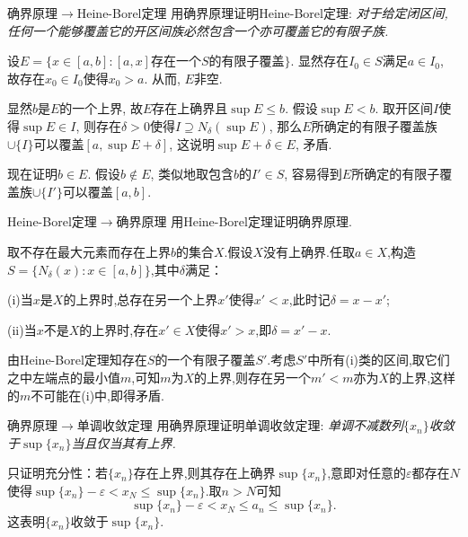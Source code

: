 \begin{exercise}{确界原理$\to$Heine-Borel定理}
	用确界原理证明Heine-Borel定理: \textit{ 对于给定闭区间,任何一个能够覆盖它的开区间族必然包含一个亦可覆盖它的有限子族. }
\end{exercise}
\begin{solution}
	设$E=\{ x \in [a,b]:[a,x]\text{存在一个$S$的有限子覆盖} \}$. 显然存在$I_0 \in S$满足$a \in I_0$, 故存在$x_0 \in I_0$使得$x_0>a$. 从而, $E$非空. 
	
	显然$b$是$E$的一个上界, 故$E$存在上确界且$\sup E \leq b$. 假设$\sup E < b$. 取开区间$I$使得$\sup E \in I$, 则存在$\delta >0$使得$I \supseteq N_{\delta}(\sup E)$, 那么$E$所确定的有限子覆盖族$\cup \{ I \}$可以覆盖$[a,\sup E+\delta]$, 这说明$\sup E+\delta \in E$, 矛盾. 
	
	现在证明$b \in E$. 假设$b \notin E$, 类似地取包含$b$的$I' \in S$, 容易得到$E$所确定的有限子覆盖族$\cup \{ I' \}$可以覆盖$[a,b]$. 
\end{solution}

\begin{exercise}{Heine-Borel定理$\to$确界原理}
	用Heine-Borel定理证明确界原理. 
\end{exercise}
\begin{solution}
	取不存在最大元素而存在上界$b$的集合$X$.假设$X$没有上确界.任取$a \in X$,构造$S=\{ N_{\delta}(x):x \in [a,b] \}$,其中$\delta$满足：
	
	(i)当$x$是$X$的上界时,总存在另一个上界$x'$使得$x'<x$,此时记$\delta =x-x'$;
	
	(ii)当$x$不是$X$的上界时,存在$x' \in X$使得$x'>x$,即$\delta = x'-x$.
	
	由Heine-Borel定理知存在$S$的一个有限子覆盖$S'$.考虑$S'$中所有(i)类的区间,取它们之中左端点的最小值$m$,可知$m$为$X$的上界,则存在另一个$m'<m$亦为$X$的上界,这样的$m$不可能在(i)中,即得矛盾.
\end{solution}

\begin{exercise}{确界原理$\to$单调收敛定理}
	用确界原理证明单调收敛定理: \textit{单调不减数列$\{ x_n \}$收敛于$\sup \{ x_n \}$当且仅当其有上界. }
\end{exercise}
\begin{solution}
	只证明充分性：若$\{ x_n \}$存在上界,则其存在上确界$\sup \{ x_n \}$,意即对任意的$\varepsilon$都存在$N$使得$\sup \{x_n\}-\varepsilon < x_N \leq \sup \{ x_n \}$.取$n>N$可知$$\sup \{x_n\}-\varepsilon < x_N \leq a_n \leq \sup \{ x_n \}.$$
	这表明$\{ x_n \}$收敛于$\sup \{ x_n \}$.
\end{solution}

